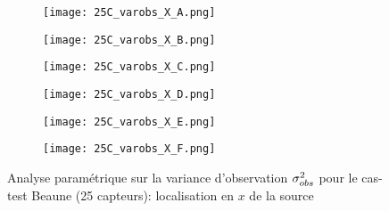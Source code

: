%
%
% 
% 
  \begin{figure}[p!]
  	\centering
  	\begin{subfigure}[t]{0.5\textwidth}
  		\centering
  		\texttt{[image: 25C\_varobs\_X\_A.png]}
  		\caption{}
  		\label{varA_x}
  	\end{subfigure}%
  	\begin{subfigure}[t]{0.5\textwidth}
  		\centering
  		\texttt{[image: 25C\_varobs\_X\_B.png]}
  		\caption{}
  		\label{varB_x}
  	\end{subfigure}
	  	\begin{subfigure}[t]{0.5\textwidth}
	  		\centering
	  		\texttt{[image: 25C\_varobs\_X\_C.png]}
	  		\caption{}
	  		\label{varC_x}
	  	\end{subfigure}%
	  	\begin{subfigure}[t]{0.5\textwidth}
	  		\centering
	  		\texttt{[image: 25C\_varobs\_X\_D.png]}
	  		\caption{}
	  		\label{varD_x}
	  	\end{subfigure}
	   	\begin{subfigure}[t]{0.5\textwidth}
	   		\centering
	   		\texttt{[image: 25C\_varobs\_X\_E.png]}
	   		\caption{}
	   		\label{varE_x}
	   	\end{subfigure}%
	   	\begin{subfigure}[t]{0.5\textwidth}
	   		\centering
	   		\texttt{[image: 25C\_varobs\_X\_F.png]}
	   		\caption{}
	   		\label{varF_x}
	   	\end{subfigure}
	   	\caption{Analyse paramétrique sur la variance d'observation ${\sigma_{obs}^2}$ pour le cas-test Beaune (25 capteurs): localisation en $x$ de la source}
	   	\label{fig_25C_analyse_varobs_x}

  \end{figure}
  
